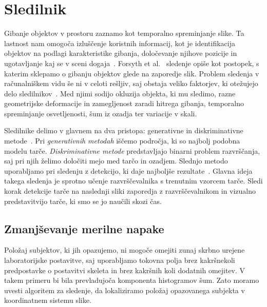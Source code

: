 \section{Sledilnik}
%
Gibanje objektov v prostoru zaznamo kot temporalno spreminjanje slike. Ta lastnost nam omogoča izluščenje koristnih informacij, kot je identifikacija objektov na podlagi karakteristike gibanja, določevanje njihove pozicije in ugotavljanje kaj se v sceni dogaja~\cite{forsyth2002computer}. Forsyth et al.~\cite{forsyth2002computer} sledenje opiše kot postopek, s katerim sklepamo o gibanju objektov glede na zaporedje slik. Problem sledenja v računalniškem vidu še ni v celoti rešljiv, saj obstaja veliko faktorjev, ki otežujejo delo sledilnikov~\cite{danelljan2014adaptive}. Med njimi sodijo okluzija objekta, ki mu sledimo, razne geometrijske deformacije in zamegljenost zaradi hitrega gibanja, temporalno spreminjanje osvetljenosti, šum iz ozadja ter variacije v skali. 

Sledilnike delimo v glavnem na dva pristopa: generativne in diskriminativne metode~\cite{danelljan2014adaptive}. Pri \emph{generativnih metodah} iščemo področja, ki so najbolj podobna modelu tarče. \emph{Diskriminativne metode} predstavljajo binarni problem razvrščanja, saj pri njih želimo določiti mejo med tarčo in ozadjem. Slednjo metodo uporabljamo pri sledenju z detekcijo, ki daje najboljše rezultate~\cite{danelljan2014adaptive}. Glavna ideja takega sledenja je sprotno učenje razvrščevalnika s trenutnim vzorcem tarče. Sledi korak detekcije tarče na naslednji sliki zaporedja z razvrščevalnikom in vizualno predstavitvijo tarče, ki smo se jo naučili skozi čas.






\subsection{Zmanjševanje merilne napake}

Položaj subjektov, ki jih opazujemo, ni mogoče omejiti zunaj skrbno urejene laboratorijske postavitve, saj uporabljamo tokovna polja brez kakršnekoli predpostavke o postavitvi skeleta in brez kakršnih koli dodatnih omejitev. V takem primeru bi bila prevladujoča komponenta histogramov šum. Zato moramo uvesti algoritem za sledenje, da lokaliziramo položaj opazovanega subjekta v koordinatnem sistemu slike.

